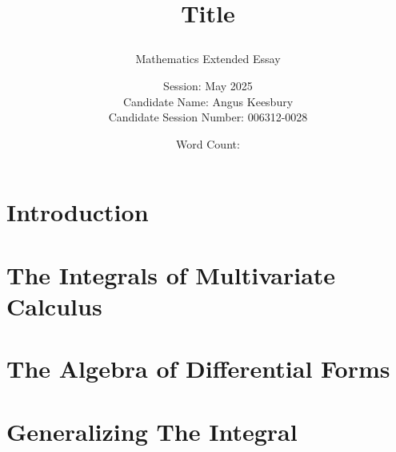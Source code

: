 \documentclass{article}
\title{Title \subtitle{Mathematics Extended Essay}}
\author{Session: May 2025 \\ Candidate Name: Angus Keesbury \\ Candidate Session Number: 006312-0028}
\date{Word Count: }
\theoremstyle{definition}
\numberwithin{equation}{section} %
\begin{document}
\newcommand{\mathhuge}[1]{\mathlarger{\mathlarger{#1}}}
\newcommand{\mathHuge}[1]{\mathhuge{\mathlarger{#1}}}
\newcommand{\R}[1]{\mathbb{R}^{#1}}
\newcommand{\Co}[1]{\cos \left( #1 \right)}
\newcommand{\Si}[1]{\sin \left( #1 \right)}
\newcommand{\ddx}[2]{\frac{d #1}{d #2}}
\newcommand{\ppx}[2]{\frac{\partial #1}{\partial #2}}
\newcommand{\pars}[1]{\left( #1 \right)}
\clearpage\maketitle
\thispagestyle{empty}
\newpage

\tableofcontents
\newpage

\renewcommand{\thesection}{\arabic{section}}

\pagestyle{fancy}
\fancyhf{}

\section{Introduction}
	


\section{The Integrals of Multivariate Calculus}
    
    
\section{The Algebra of Differential Forms}
    

\section{Generalizing The Integral}
    
\end{document}
